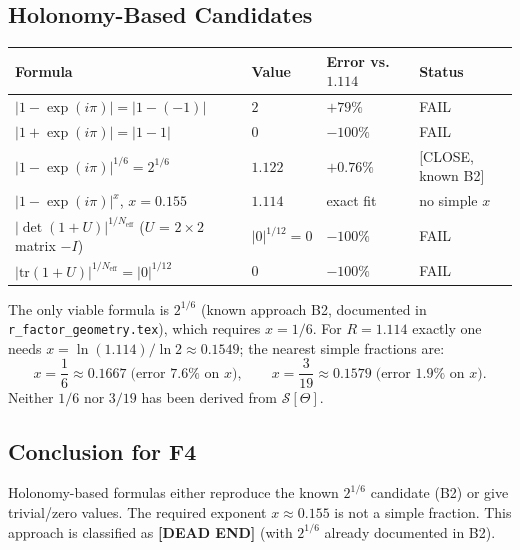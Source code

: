 \documentclass[11pt,a4paper]{article}
\theoremstyle{remark}
\begin{document}
\subsection{Holonomy-Based Candidates}

\begin{center}
\begin{tabular}{llll}
  \toprule
  Formula & Value & Error vs.\ $1.114$ & Status \\
  \midrule
  $|1 - \exp(i\pi)| = |1 - (-1)|$         & $2$       & $+79\%$ & FAIL \\
  $|1 + \exp(i\pi)| = |1 - 1|$            & $0$       & $-100\%$ & FAIL \\
  $|1 - \exp(i\pi)|^{1/6} = 2^{1/6}$      & $1.122$   & $+0.76\%$ & [CLOSE, known B2] \\
  $|1 - \exp(i\pi)|^x$, $x = 0.155$       & $1.114$   & exact fit & no simple $x$ \\
  $|\det(1+U)|^{1/N_{\mathrm{eff}}}$ ($U$ = $2\times 2$ matrix $-I$)
    & $|0|^{1/12} = 0$ & $-100\%$ & FAIL \\
  $|\mathrm{tr}(1 + U)|^{1/N_{\mathrm{eff}}} = |0|^{1/12}$
    & $0$ & $-100\%$ & FAIL \\
  \bottomrule
\end{tabular}
\end{center}

The only viable formula is $2^{1/6}$ (known approach B2, documented in
\texttt{r\_factor\_geometry.tex}), which requires $x = 1/6$.  For $R =
1.114$ exactly one needs $x = \ln(1.114)/\ln 2 \approx 0.1549$; the
nearest simple fractions are:
\begin{equation}
  x = \frac{1}{6} \approx 0.1667 \;\text{(error }7.6\%\text{ on }x\text{)},
  \qquad
  x = \frac{3}{19} \approx 0.1579 \;\text{(error }1.9\%\text{ on }x\text{)}.
\end{equation}
Neither $1/6$ nor $3/19$ has been derived from $\mathcal{S}[\Theta]$.

\subsection{Conclusion for F4}

Holonomy-based formulas either reproduce the known $2^{1/6}$ candidate
(B2) or give trivial/zero values.  The required exponent $x \approx 0.155$
is not a simple fraction.  This approach is classified as
\textbf{[DEAD END]} (with $2^{1/6}$ already documented in B2).

\end{document}
